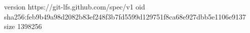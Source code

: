 version https://git-lfs.github.com/spec/v1
oid sha256:feb9b49a98d2082b83ef248f3b7fd5599d129751f8ca68e927dbb5e1106e9137
size 1398256
